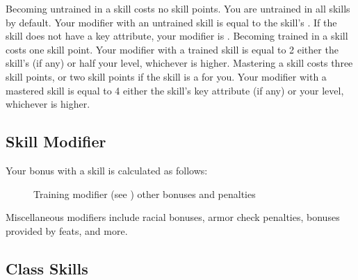         \begin{itemize}
             Becoming untrained in a skill costs no skill points.
                You are untrained in all skills by default.
                Your modifier with an untrained skill is equal to the skill's .
                If the skill does not have a key attribute, your modifier is .
             Becoming trained in a skill costs one skill point.
                Your modifier with a trained skill is equal to 2 \add either the skill's  (if any) or half your level, whichever is higher.
             Mastering a skill costs three skill points, or two skill points if the skill is a  for you.
                Your modifier with a mastered skill is equal to 4 \add either the skill's key attribute (if any) or your level, whichever is higher.
        \end{itemize}

    \subsection{Skill Modifier}\label{Skill Modifier}

        Your bonus with a skill is calculated as follows:

        \begin{figure}[h]
            \centering Training modifier (see ) \add other bonuses and penalties
        \end{figure}

         Miscellaneous modifiers include racial bonuses, armor check penalties, bonuses provided by feats, and more.

    \subsection{Class Skills}

